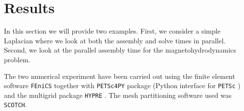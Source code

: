 \documentclass[11pt]{article}
\newcommand{\fenics}{{\tt FEniCS} }
\begin{document}



\section{Results}

In this section we will provide two examples. First, we consider a simple Laplacian where we look at both the assembly and solve times in parallel. Second, we look at the parallel assembly time for the magnetohydrodynamics problem.

The two numerical experiment have been carried out using the finite element software \fenics \cite{wells2012automated} together with {\tt PETSc4PY} package (Python interface for {\tt PETSc} \cite{petsc-user-ref,petsc-web-page}) and the multigrid package {\tt HYPRE} \cite{falgout2002hypre}. The mesh partitioning software used was {\tt SCOTCH}. %
\end{document}
